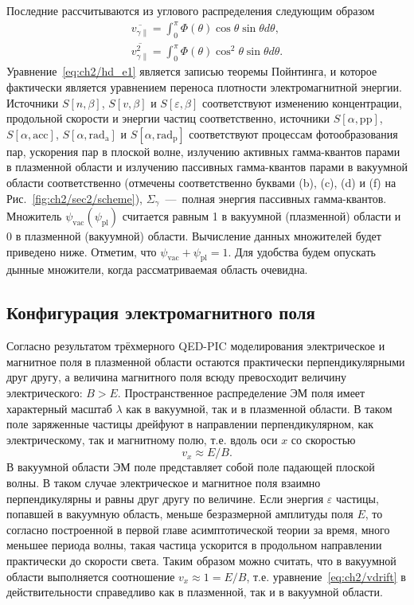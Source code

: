 Последние рассчитываются из углового распределения следующим образом
\begin{align}
    \overline{v_{\gamma\parallel}} = \int_0^\pi \Phi(\theta)\cos\theta\sin\theta d\theta, \\
    \overline{v_{\gamma\parallel}^2} = \int_0^\pi \Phi(\theta)\cos^2\theta\sin\theta d\theta.
\end{align}
Уравнение~\eqref{eq:ch2/hd_e1} является записью теоремы Пойнтинга, и которое фактически является уравнением переноса плотности электромагнитной энергии.
Источники $S[n,\beta]$, $S[v,\beta]$ и $S[\varepsilon,\beta]$ соответствуют изменению концентрации, продольной скорости и энергии частиц соответственно, источники $S[\alpha, \mathrm{pp}]$, $S[\alpha, \mathrm{acc}]$, $S[\alpha, \mathrm{rad_a}]$ и $S[\alpha, \mathrm{rad_p}]$ соответствуют процессам фотообразования пар, ускорения пар в плоской волне, излучению активных гамма-квантов парами в плазменной области и излучению пассивных гамма-квантов парами в вакуумной области соответственно (отмечены соответственно буквами (b), (c), (d) и (f) на Рис.~\ref{fig:ch2/sec2/scheme}), $\Sigma_\gamma$~---~полная энергия пассивных гамма-квантов.
Множитель $\psi_\mathrm{vac}(\psi_\mathrm{pl})$ считается равным 1 в вакуумной (плазменной) области и 0 в плазменной (вакуумной) области.
Вычисление данных множителей будет приведено ниже.
Отметим, что $\psi_\mathrm{vac}+\psi_\mathrm{pl}=1$.
Для удобства будем опускать дынные множители, когда рассматриваемая область очевидна.

\subsection{Конфигурация электромагнитного поля}
\label{sub:ch2/sec3/fields}

Согласно результатом трёхмерного QED-PIC моделирования электрическое и магнитное поля в плазменной области остаются практически перпендикулярными друг другу, а величина магнитного поля всюду превосходит величину электрического: $B > E$.
Пространственное распределение ЭМ поля имеет характерный масштаб $\lambda$ как в вакуумной, так и в плазменной области.
В таком поле заряженные частицы дрейфуют в направлении перпендикулярном, как электрическому, так и магнитному полю, т.е. вдоль оси $x$ со скоростью
\begin{equation}
    \label{eq:ch2/vdrift}
    v_x\approx E/B.
\end{equation}
В вакуумной области ЭМ поле представляет собой поле падающей плоской волны.
В таком случае электрическое и магнитное поля взаимно перпендикулярны и равны друг другу по величине.
Если энергия $\varepsilon$ частицы, попавшей в вакуумную область, меньше безразмерной амплитуды поля $E$, то согласно построенной в первой главе асимптотической теории за время, много меньшее периода волны, такая частица ускорится в продольном направлении практически до скорости света.
Таким образом можно считать, что в вакуумной области выполняется соотношение $v_x\approx 1=E/B$, т.е. уравнение~\eqref{eq:ch2/vdrift} в действительности справедливо как в плазменной, так и в вакуумной области.

